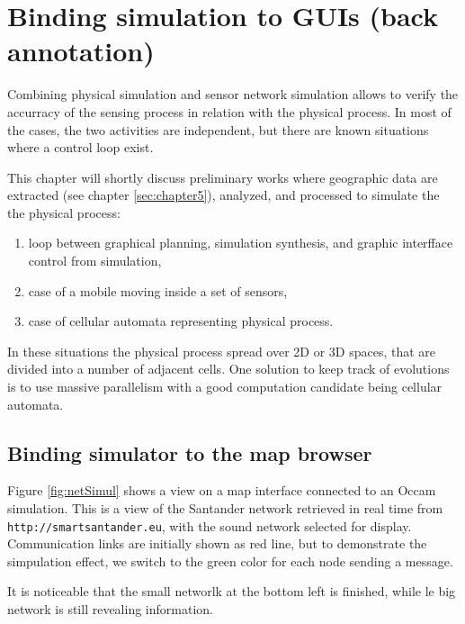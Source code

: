 
\chapter{Binding simulation to GUIs (back annotation)}

Combining physical simulation and sensor network simulation allows to verify
the accurracy of the sensing process in relation with the physical process.
In most of the cases, the two activities are independent, but there are known situations
where a control loop exist.

This chapter will shortly discuss preliminary works where geographic data are
extracted (see chapter \ref{sec:chapter5}), analyzed, and processed to simulate the
the physical process:
\begin{enumerate}
\item loop between graphical planning, simulation synthesis, and graphic interfface control from simulation,
\item case of a mobile moving inside a set of sensors,
\item case of cellular automata representing physical process.
\end{enumerate}


In these situations the physical process spread over 2D or 3D spaces, that are
divided into a number of adjacent cells. One solution to keep track of evolutions 
is to use massive parallelism with a good computation candidate being cellular automata.


\section{Binding  simulator to the map browser}
Figure
\ref{fig:netSimul} shows a view on a map interface connected to an Occam simulation. 
This is a view of the Santander network retrieved in real time from {\tt http://smartsantander.eu},
with the sound network selected for display. Communication links are initially shown as red line,
but to demonstrate the simpulation effect, we switch to the green color for each node sending
a message. 

It is noticeable that the small networlk at the bottom left is finished, while le big network 
is still revealing information.


